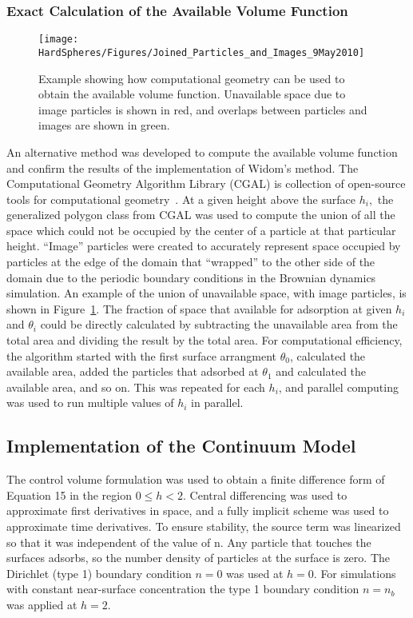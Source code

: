 \subsubsection{Exact Calculation of the Available Volume Function}

%
\begin{figure}
\texttt{[image: HardSpheres/Figures/Joined\_Particles\_and\_Images\_9May2010]}

\caption{\label{fig:Computational geometry}Example showing how computational
geometry can be used to obtain the available volume function. Unavailable
space due to image particles is shown in red, and overlaps between
particles and images are shown in green.}


%
\end{figure}
An alternative method was developed to compute the available volume
function and confirm the results of the implementation of Widom's
method. The Computational Geometry Algorithm Library (CGAL) is collection
of open-source tools for computational geometry~\cite{CGAL}. At
a given height above the surface $h_{i},$ the generalized polygon
class from CGAL was used to compute the union of all the space which\emph{
}could not be occupied by the center of a particle at that particular
height. {}``Image'' particles were created to accurately represent
space occupied by particles at the edge of the domain that {}``wrapped''
to the other side of the domain due to the periodic boundary conditions
in the Brownian dynamics simulation. An example of the union of unavailable
space, with image particles, is shown in Figure~\ref{fig:Computational geometry}.
The fraction of space that available for adsorption at given $h_{i}$
and $\theta_{i}$ could be directly calculated by subtracting the
unavailable area from the total area and dividing the result by the
total area. For computational efficiency, the algorithm started with
the first surface arrangment $\theta_{0}$, calculated the available
area, added the particles that adsorbed at $\theta_{1}$ and calculated
the available area, and so on. This was repeated for each $h_{i}$,
and parallel computing was used to run multiple values of $h_{i}$
in parallel.


\subsection{Implementation of the Continuum Model}

The control volume formulation \cite{Patankar1980} was used to obtain
a finite difference form of Equation 15 in the region $0\leq h<2$.
Central differencing was used to approximate first derivatives in
space, and a fully implicit scheme was used to approximate time derivatives.
To ensure stability, the source term was linearized so that it was
independent of the value of n. Any particle that touches the surfaces
adsorbs, so the number density of particles at the surface is zero.
The Dirichlet (type 1) boundary condition $n=0$ was used at $h=0$.
For simulations with constant near-surface concentration the type
1 boundary condition $n=n_{b}$ was applied at $h=2$. 


